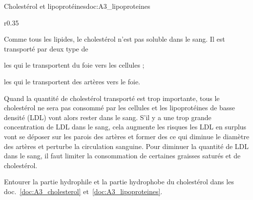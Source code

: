 \begin{doc}{Cholestérol et lipoprotéines}{doc:A3_lipoproteines}
  \begin{wrapfigure}[15]{r}{0.35\linewidth}
    \vspace*{-30pt}
    \centering

  \end{wrapfigure}
  
  Comme tous les lipides, le cholestérol n'est pas soluble dans le sang.
  Il est transporté par deux type de 
  \begin{listePoints}
    \item les  qui le transportent du foie vers les cellules ;
    \item les  qui le transportent des artères vers le foie.
  \end{listePoints}

  Quand la quantité de cholestérol transporté est trop importante, tous le cholestérol ne sera pas consommé par les cellules et les lipoprotéines de basse densité (LDL) vont alors rester dans le sang.
  S'il y a une trop grande concentration de LDL dans le sang, cela augmente les risques  les LDL en surplus vont se déposer sur les parois des artères et former des  ce qui diminue le diamètre des artères et perturbe la circulation sanguine.
  Pour diminuer la quantité de LDL dans le sang, il faut limiter la consommation de certaines graisses saturés et de cholestérol.
\end{doc}


\numeroQuestion
  Entourer la partie hydrophile et la partie hydrophobe du cholestérol dans les doc.~\ref{doc:A3_cholesterol} et~\ref{doc:A3_lipoproteines}.